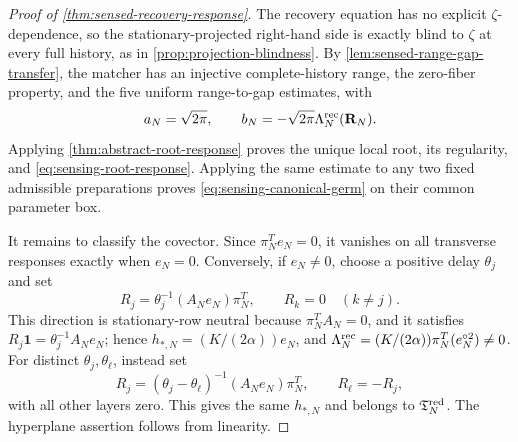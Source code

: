 \begin{proof}[Proof of \cref{thm:sensed-recovery-response}]
The recovery equation has no explicit \(\zeta\)-dependence, so the
stationary-projected right-hand side is exactly blind to \(\zeta\) at every
full history, as in \cref{prop:projection-blindness}.  By
\cref{lem:sensed-range-gap-transfer}, the matcher has an injective
complete-history range, the zero-fiber property, and the five uniform
range-to-gap estimates, with
\[
 a_N=\sqrt{2\pi},\qquad
 b_N=-\sqrt{2\pi}\Lambda_N^{\rm rec}(\mathbf R_N).
\]
Applying \cref{thm:abstract-root-response} proves the unique local root,
its regularity, and \cref{eq:sensing-root-response}.  Applying the same
estimate to any two fixed admissible preparations proves
\cref{eq:sensing-canonical-germ} on their common parameter box.

It remains to classify the covector.  Since \(\pi_N^Te_N=0\), it vanishes
on all transverse responses exactly when \(e_N=0\).  Conversely, if
\(e_N\ne0\), choose a positive delay \(\theta_j\) and set
\begin{equation}
 R_j=\theta_j^{-1}(A_Ne_N)\pi_N^T,
 \qquad R_k=0\quad(k\ne j).                          \label{eq:sensing-single-layer-witness}
\end{equation}
This direction is stationary-row neutral because \(\pi_N^TA_N=0\), and it
satisfies \(R_j\mathbf1=\theta_j^{-1}A_Ne_N\); hence
\(h_{*,N}=(K/(2\alpha))e_N\), and
\(\Lambda_N^{\rm rec}=(K/(2\alpha))\pi_N^T(e_N^{\circ2})\ne0\).
For distinct \(\theta_j,\theta_\ell\), instead set
\begin{equation}
 R_j=(\theta_j-\theta_\ell)^{-1}(A_Ne_N)\pi_N^T,
 \qquad R_\ell=-R_j,                                 \label{eq:sensing-two-layer-witness}
\end{equation}
with all other layers zero.  This gives the same \(h_{*,N}\) and belongs to
\(\mathfrak T_N^{\rm red}\).  The hyperplane assertion follows from
linearity.
\end{proof}

